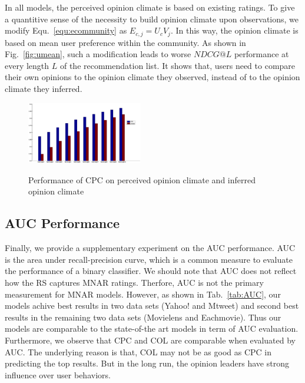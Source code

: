 \documentclass[sigconf]{acmart}
\begin{document}
In all models, the perceived opinion climate is based on existing ratings. To give a quantitive sense of the necessity to build opinion climate upon observations, we modify Equ.~\ref{equ:ecommunity} as $E_{c,j}=U_cV_j$. In this way, the opinion climate is based on mean user preference within the community.  As shown in Fig.~\ref{fig:umean}, such a modification leads to worse $NDCG@L$ performance at every length $L$ of the recommendation list. It shows that, users need to compare their own opinions to the opinion climate they observed, instead of to the opinion climate they inferred.

\begin{figure}[htbp]
\begin{center}
\includegraphics[width=0.45\textwidth]{fig15_umean.eps}
\caption{Performance of CPC on perceived opinion climate and inferred opinion climate}\label{fig:umean}
\label{default}
\end{center}
\end{figure}



\subsection{AUC Performance}
Finally, we provide a supplementary experiment on the AUC performance. AUC is the area under recall-precision curve, which is a common measure to evaluate the performance of a binary classifier. We should note that AUC does not reflect how the RS captures MNAR ratings. Therfore, AUC is not the primary measurement for MNAR models. However, as shown in Tab.~\ref{tab:AUC}, our models achive best results in two data sets (Yahoo! and Mtweet) and second best results in the remaining two data sets (Movielens and Eachmovie). Thus our models are comparable to the state-of-the art models in term of AUC evaluation. Furthermore, we observe that CPC and COL are comparable when evaluated by AUC.   The underlying reason is that, COL may not be as good as CPC in predicting the top results. But in the long run, the opinion leaders have strong influence over user behaviors. 
\end{document}
